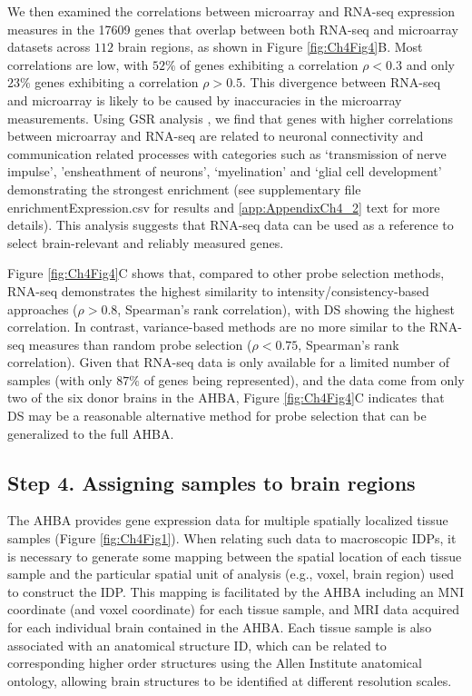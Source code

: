 We then examined the correlations between microarray and RNA-seq expression measures in the \num{17609} genes that overlap between both RNA-seq and microarray datasets across $112$ brain regions, as shown in Figure \ref{fig:Ch4Fig4}B. Most correlations are low, with $52\%$ of genes exhibiting a correlation $\rho < 0.3$ and only $23\%$ genes exhibiting a correlation $\rho > 0.5$. This divergence between RNA-seq and microarray is likely to be caused by inaccuracies in the microarray measurements. Using GSR analysis \citep{Gillis2010}, we find that genes with higher correlations between microarray and RNA-seq are related to neuronal connectivity and communication related processes with categories such as ‘transmission of nerve impulse’, ’ensheathment of neurons’, ‘myelination’ and ‘glial cell development’ demonstrating the strongest enrichment (see supplementary file enrichmentExpression.csv for results and \ref{app:AppendixCh4_2} text for more details). This analysis suggests that RNA-seq data can be used as a reference to select brain-relevant and reliably measured genes.

Figure \ref{fig:Ch4Fig4}C shows that, compared to other probe selection methods, RNA-seq demonstrates the highest similarity to intensity/consistency-based approaches ($\rho > 0.8$, Spearman’s rank correlation), with DS showing the highest correlation. In contrast, variance-based methods are no more similar to the RNA-seq measures than random probe selection ($\rho < 0.75$, Spearman’s rank correlation). Given that RNA-seq data is only available for a limited number of samples (with only $87\%$ of genes being represented), and the data come from only two of the six donor brains in the AHBA, Figure \ref{fig:Ch4Fig4}C indicates that DS may be a reasonable alternative method for probe selection that can be generalized to the full AHBA.

\subsection{Step 4. Assigning samples to brain regions}

The AHBA provides gene expression data for multiple spatially localized tissue samples (Figure \ref{fig:Ch4Fig1}). When relating such data to macroscopic IDPs, it is necessary to generate some mapping between the spatial location of each tissue sample and the particular spatial unit of analysis (e.g., voxel, brain region) used to construct the IDP. This mapping is facilitated by the AHBA including an MNI coordinate (and voxel coordinate) for each tissue sample, and MRI data acquired for each individual brain contained in the AHBA. Each tissue sample is also associated with an anatomical structure ID, which can be related to corresponding higher order structures using the Allen Institute anatomical ontology, allowing brain structures to be identified at different resolution scales.

